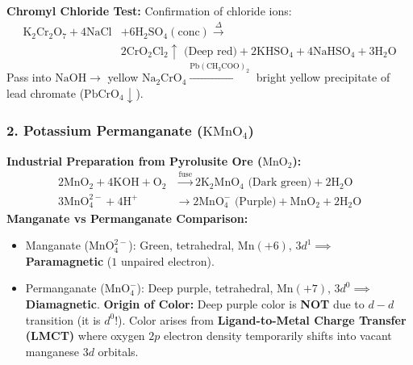 \documentclass[10pt,twoside,openright]{book}
\begin{document}
\textbf{Chromyl Chloride Test:} Confirmation of chloride ions:
\begin{align}
  \mathrm{K_2Cr_2O_7} + 4\mathrm{NaCl} &+ 6\mathrm{H_2SO_4(conc)} \xrightarrow{\Delta} \\
  &2\mathbf{\mathrm{CrO_2Cl_2\uparrow\text{ (Deep red)}}} + 2\mathrm{KHSO_4} + 4\mathrm{NaHSO_4} + 3\mathrm{H_2O}
\end{align}
Pass into $\mathrm{NaOH} \to$ yellow $\mathrm{Na_2CrO_4} \xrightarrow{\mathrm{Pb(CH_3COO)_2}}$ bright yellow precipitate of lead chromate ($\mathrm{PbCrO_4\downarrow}$).

\subsubsection{2. Potassium Permanganate ($\mathrm{KMnO_4}$)}
\textbf{Industrial Preparation from Pyrolusite Ore ($\mathrm{MnO_2}$):}
\begin{align}
  2\mathrm{MnO_2} + 4\mathrm{KOH} + \mathrm{O_2} &\xrightarrow{\text{fuse}} 2\mathbf{\mathrm{K_2MnO_4\text{ (Dark green)}}} + 2\mathrm{H_2O} \\
  3\mathrm{MnO_4^{2-}} + 4\mathrm{H^+} &\longrightarrow 2\mathbf{\mathrm{MnO_4^-\text{ (Purple)}}} + \mathrm{MnO_2} + 2\mathrm{H_2O}
\end{align}
\textbf{Manganate vs Permanganate Comparison:}
\begin{itemize}
  \item Manganate ($\mathrm{MnO_4^{2-}}$): Green, tetrahedral, $\mathrm{Mn(+6)}$, $3d^1 \implies$ \textbf{Paramagnetic} ($1$ unpaired electron).
  \item Permanganate ($\mathrm{MnO_4^-}$): Deep purple, tetrahedral, $\mathrm{Mn(+7)}$, $3d^0 \implies$ \textbf{Diamagnetic}.
  \textbf{Origin of Color:} Deep purple color is \textbf{NOT} due to $d-d$ transition (it is $d^0$!). Color arises from \textbf{Ligand-to-Metal Charge Transfer (LMCT)} where oxygen $2p$ electron density temporarily shifts into vacant manganese $3d$ orbitals.
\end{itemize}
\end{document}
